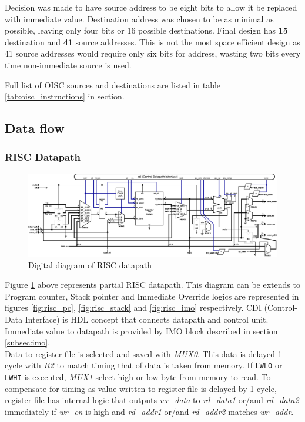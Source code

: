 Decision was made to have source address to be eight bits to allow it be replaced with immediate value. Destination address was chosen to be as minimal as possible, leaving only four bits or 16 possible destinations. Final design has \textbf{15} destination and \textbf{41} source addresses. This is not the most space efficient design as 41 source addresses would require only six bits for address, wasting two bits every time non-immediate source is used.

Full list of OISC sources and destinations are listed in table \ref{tab:oisc_instructions} in  section.

\begin{landscape}
	\subsection{Data flow} \label{sec:dataflow}
	\subsubsection{RISC Datapath} \label{subsec:datapath}
	\begin{figure}[h!]
		\centering
		\includegraphics[width=\linewidth]{../resources/datapath.eps}
		\caption{Digital diagram of RISC datapath}
		\label{fig:datapath}	
	\end{figure}
	
	Figure \ref{fig:datapath} above represents partial RISC datapath. This diagram can be extends to Program counter, Stack pointer and Immediate Override logics are represented in figures \ref{fig:risc_pc}, \ref{fig:risc_stack} and \ref{fig:risc_imo} respectively. CDI (Control-Data Interface) is HDL concept that connects datapath and control unit. Immediate value to datapath is provided by IMO block described in section \ref{subsec:imo}.\\
	Data to register file is selected and saved with \textit{MUX0}. This data is delayed 1 cycle with \textit{R2} to match timing that of data is taken from memory. If \texttt{LWLO} or \texttt{LWHI} is executed, \textit{MUX1} select high or low byte from memory to read. To compensate for timing as value written to register file is delayed by 1 cycle, register file has internal logic that outputs \textit{wr\_data} to \textit{rd\_data1} or/and  \textit{rd\_data2} immediately if \textit{wr\_en} is high and \textit{rd\_addr1} or/and \textit{rd\_addr2} matches \textit{wr\_addr}. \\
\end{landscape}
